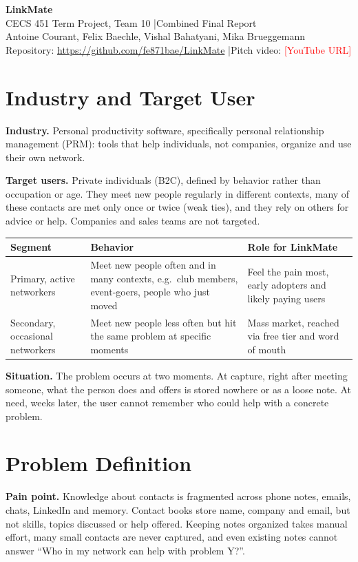 \documentclass[11pt,letterpaper]{article}
\newcommand{\confirm}[1]{\textcolor{red}{#1}}
\begin{document}
\begin{center}
  {\Large\bfseries LinkMate}\\[1pt]
  CECS 451 Term Project, Team 10 \quad|\quad Combined Final Report\\[1pt]
  Antoine Courant, Felix Baechle, Vishal Bahatyani, Mika Brueggemann\\[1pt]
  Repository: \url{https://github.com/fe871bae/LinkMate} \quad|\quad Pitch video: \confirm{[YouTube URL]}
\end{center}

\section{Industry and Target User}
\textbf{Industry.} Personal productivity software, specifically personal relationship management (PRM): tools that help individuals, not companies, organize and use their own network.

\textbf{Target users.} Private individuals (B2C), defined by behavior rather than occupation or age. They meet new people regularly in different contexts, many of these contacts are met only once or twice (weak ties), and they rely on others for advice or help. Companies and sales teams are not targeted.

\begin{center}\small
\begin{tabularx}{\linewidth}{@{}lYY@{}}
  \toprule
  Segment & Behavior & Role for LinkMate \\
  \midrule
  Primary, active networkers & Meet new people often and in many contexts, e.g.\ club members, event-goers, people who just moved & Feel the pain most, early adopters and likely paying users \\
  Secondary, occasional networkers & Meet new people less often but hit the same problem at specific moments & Mass market, reached via free tier and word of mouth \\
  \bottomrule
\end{tabularx}
\end{center}

\textbf{Situation.} The problem occurs at two moments. At capture, right after meeting someone, what the person does and offers is stored nowhere or as a loose note. At need, weeks later, the user cannot remember who could help with a concrete problem.

\section{Problem Definition}
\textbf{Pain point.} Knowledge about contacts is fragmented across phone notes, emails, chats, LinkedIn and memory. Contact books store name, company and email, but not skills, topics discussed or help offered. Keeping notes organized takes manual effort, many small contacts are never captured, and even existing notes cannot answer ``Who in my network can help with problem Y?''.
\end{document}

